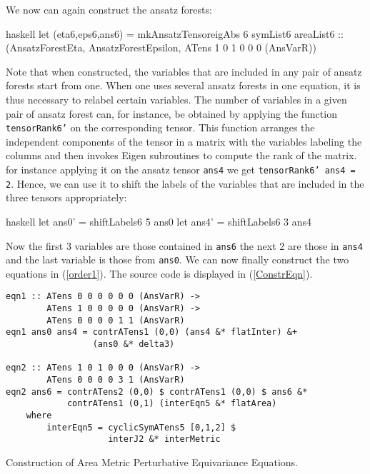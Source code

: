 We now can again construct the ansatz forests:
\begin{center}
\begin{cminted}{haskell}
let (eta6,eps6,ans6) = mkAnsatzTensoreigAbs 6 symList6 areaList6 :: 
                       (AnsatzForestEta, AnsatzForestEpsilon,
                       ATens 1 0 1 0 0 0 (AnsVarR))
\end{cminted}
\end{center}
Note that when constructed, the variables that are included in any pair of ansatz forests start from one. When one uses several ansatz forests in one equation, it is thus necessary to relabel certain variables. The number of variables in a given pair of ansatz forest can, for instance, be obtained by applying the function \texttt{tensorRank6'} on the corresponding tensor. This function arranges the independent components of the tensor in a matrix with the variables labeling the columns and then invokes Eigen subroutines to compute the rank of the matrix. for instance applying it on the ansatz tensor \texttt{ans4} we get \texttt{tensorRank6' ans4 = 2}. Hence, we can use it to shift the labels of the variables that are included in the three tensors appropriately:
\begin{center}
\begin{cminted}{haskell}
let ans0' = shiftLabels6 5 ans0
let ans4' = shiftLabels6 3 ans4 
\end{cminted}
\end{center}

Now the first 3 variables are those contained in \texttt{ans6} the next 2 are those in \texttt{ans4} and the last variable is those from \texttt{ans0}.
We can now finally construct the two equations in (\ref{order1}). The source code is displayed in (\ref{ConstrEqn}).
\begin{listing}[hbt!]
\begin{verbatim}
eqn1 :: ATens 0 0 0 0 0 0 (AnsVarR) ->
        ATens 1 0 0 0 0 0 (AnsVarR) ->
        ATens 0 0 0 0 1 1 (AnsVarR)
eqn1 ans0 ans4 = contrATens1 (0,0) (ans4 &* flatInter) &+
                 (ans0 &* delta3)
                 
eqn2 :: ATens 1 0 1 0 0 0 (AnsVarR) ->
        ATens 0 0 0 0 3 1 (AnsVarR)
eqn2 ans6 = contrATens2 (0,0) $ contrATens1 (0,0) $ ans6 &*
            contrATens1 (0,1) (interEqn5 &* flatArea)
    where 
        interEqn5 = cyclicSymATens5 [0,1,2] $
                    interJ2 &* interMetric
\end{verbatim} 
\caption{Construction of Area Metric Perturbative Equivariance  Equations.}\label{ConstrEqn}
\end{listing}


